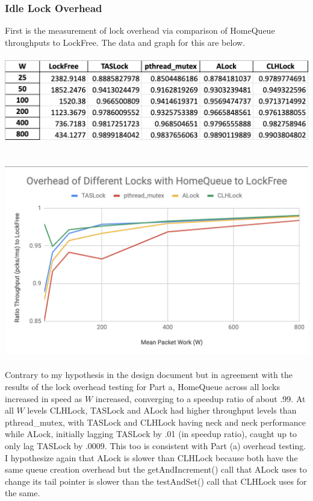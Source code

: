 \documentclass{article}
\begin{document}
\begin{adjustwidth}{-2cm}{-2cm}
\subsubsection{Idle Lock Overhead}
First is the measurement of lock overhead via comparison of HomeQueue throughputs to LockFree. The data and graph for this are below.\\
\null\\
\includegraphics[width=\linewidth]{b_overhead2freeData.png}\\ \null\\
\null\\
\includegraphics[width=\linewidth]{b_overhead2freeGraph.png}\\ \null\\
Contrary to my hypothesis in the design document but in agreement with the results of the lock overhead testing for Part a, HomeQueue across all locks increased in speed as $W$ increased, converging to a speedup ratio of about .99. At all $W$ levels CLHLock, TASLock and ALock had higher throughput levels than pthread\_mutex, with TASLock and CLHLock having neck and neck performance while ALock, initially lagging TASLock by .01 (in speedup ratio), caught up to only lag TASLock by .0009. This too is consistent with Part (a) overhead testing.\\
I hypothesize again that ALock is slower than CLHLock because both have the same queue creation overhead but the getAndIncrement() call that ALock uses to change its tail pointer is slower than the testAndSet() call that CLHLock uses for the same.\\

\end{adjustwidth}
\end{document}
